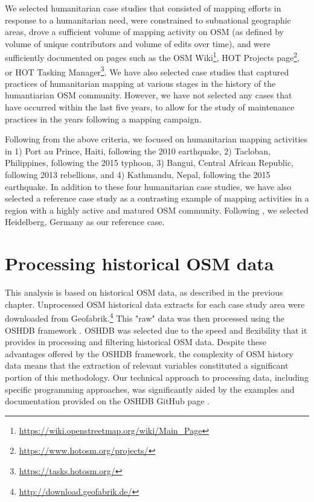 We selected humanitarian case studies that consisted of mapping efforts in response to a humanitarian need, were constrained to subnational geographic areas, drove a sufficient volume of mapping activity on OSM (as defined by volume of unique contributors and volume of edits over time), and were sufficiently documented on pages such as the OSM Wiki\footnote{\url{https://wiki.openstreetmap.org/wiki/Main_Page}}, HOT Projects page\footnote{\url{https://www.hotosm.org/projects/}}, or HOT Tasking Manager\footnote{\url{https://tasks.hotosm.org/}}. We have also selected case studies that captured practices of humanitarian mapping at various stages in the history of the humantiarian OSM community. However, we have not selected any cases that have occurred within the last five years, to allow for the study of maintenance practices in the years following a mapping campaign.  

Following from the above criteria, we focused on humanitarian mapping activities in 1) Port au Prince, Haiti, following the 2010 earthquake, 2) Tacloban, Philippines, following the 2015 typhoon, 3) Bangui, Central African Republic, following 2013 rebellions, and 4) Kathmandu, Nepal, following the 2015 earthquake. In addition to these four humanitarian case studies, we have also selected a reference case study as a contrasting example of mapping activities in a region with a highly active and matured OSM community. Following \textcite{anderson_crowd_2018}, we selected Heidelberg, Germany as our reference case.

\section{Processing historical OSM data}
\label{sec:history}

This analysis is based on historical OSM data, as described in the previous chapter. Unprocessed OSM historical data extracts for each case study area were downloaded from Geofabrik.\footnote{\url{http://download.geofabrik.de/}} This "raw" data was then processed using the OSHDB framework \parencite{raifer_oshdb_2019}. OSHDB was selected due to the speed and flexibility that it provides in processing and filtering historical OSM data. Despite these advantages offered by the OSHDB framework, the complexity of OSM history data means that the extraction of relevant variables constituted a significant portion of this methodology. Our technical approach to processing data, including specific programming approaches, was significantly aided by the examples and documentation provided on the OSHDB GitHub page \parencite{heidelberg_institute_for_geoinformation_technology_oshdb_2020}.

